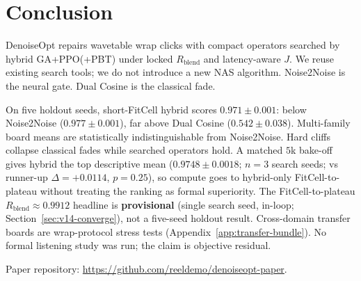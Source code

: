 \section{Conclusion}
\label{sec:conclusion}

DenoiseOpt repairs wavetable wrap clicks with compact operators searched by hybrid GA+PPO(+PBT) under locked $R_{\mathrm{blend}}$ and latency-aware $J$.
We reuse existing search tools; we do not introduce a new NAS algorithm.
Noise2Noise is the neural gate. Dual Cosine is the classical fade.

On five holdout seeds, short-FitCell hybrid scores $0.971{\pm}0.001$: below Noise2Noise ($0.977{\pm}0.001$), far above Dual Cosine ($0.542{\pm}0.038$).
Multi-family board means are statistically indistinguishable from Noise2Noise.
Hard cliffs collapse classical fades while searched operators hold.
A matched $5$k bake-off gives hybrid the top descriptive mean ($0.9748{\pm}0.0018$; $n{=}3$ search seeds; vs runner-up $\Delta{=}{+}0.0114$, $p{=}0.25$), so compute goes to hybrid-only FitCell-to-plateau without treating the ranking as formal superiority.
The FitCell-to-plateau $R_{\mathrm{blend}}{\approx}0.9912$ headline is \textbf{provisional} (single search seed, in-loop; Section~\ref{sec:v14-converge}), not a five-seed holdout result.
Cross-domain transfer boards are wrap-protocol stress tests (Appendix~\ref{app:transfer-bundle}).
No formal listening study was run; the claim is objective residual.

Paper repository: \url{https://github.com/reeldemo/denoiseopt-paper}.
